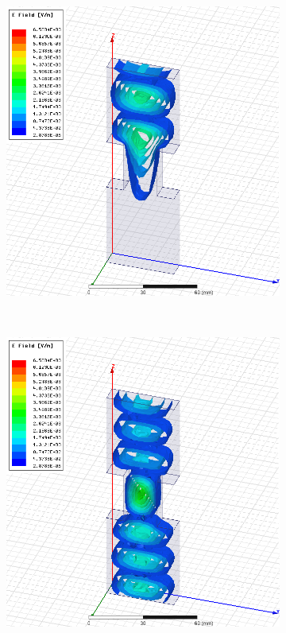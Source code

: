 \documentclass[12pt,a4paper]{article}
\begin{document}
\begin{figure}
\begin{subfigure}[b]{0.49\textwidth}
    \includegraphics[width=\textwidth]{./mid_sec_20mm_wide_30mm_long/7ghz.png}
    \label{fig:2_2030_7ghz}
  \end{subfigure}\\
  \begin{subfigure}[b]{0.49\textwidth}
    \includegraphics[width=\textwidth]{./mid_sec_20mm_wide_30mm_long/9ghz.png}

\end{subfigure}
\end{figure}
\end{document}
